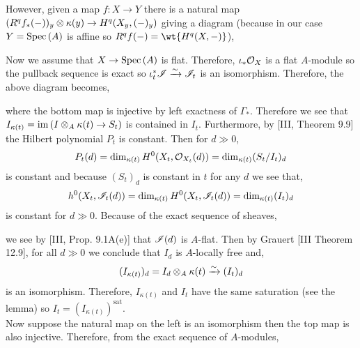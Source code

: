 \documentclass[12pt]{article}
\begin{document}
However, given a map $f : X \to Y$ there is a natural map $(R^q f_* (-))_y \otimes \kappa(y) \to H^q(X_y, (-)_y)$ giving a diagram (because in our case $Y = \mathrm{Spec}\left( A \right)$ is affine so $R^q f(-) = \wt{H^q(X, -)}$),
\begin{center}
\end{center}
Now we assume that $X \to \mathrm{Spec}\left( A \right)$ is flat. Therefore, $\iota_* \mathcal{O}_{X}$ is a flat $A$-module so the pullback sequence is exact so $\iota_t^* \mathscr{I} \xrightarrow{\sim} \mathscr{I}_t$ is an isomorphism. Therefore, the above diagram becomes,
\begin{center}
\end{center}
where the bottom map is injective by left exactness of $\Gamma_*$. Therefore we see that $I_{\kappa(t)} = \operatorname{\mathrm{im}}{(I \otimes_A \kappa(t) \to S_t)}$ is contained in $I_t$. Furthermore, by [III, Theorem 9.9] the Hilbert polynomial $P_t$ is constant. Then for $d \gg 0$,
\[ P_t(d) = \dim_{\kappa(t)} H^0(X_t, \mathcal{O}_{X_t}(d)) = \dim_{\kappa(t)} (S_t / I_t)_d \]
is constant and because $(S_t)_d$ is constant in $t$ for any $d$ we see that,
\[ h^0(X_t, \mathscr{I}_t(d)) = \dim_{\kappa(t)} H^0(X_t, \mathscr{I}_t(d)) = \dim_{\kappa(t)} (I_t)_d \]
is constant for $d \gg 0$. Because of the exact sequence of sheaves,
\begin{center}
\end{center}
we see by [III, Prop. 9.1A(e)] that $\mathscr{I}(d)$ is $A$-flat. Then by Grauert [III Theorem 12.9], for all $d \gg 0$ we conclude that $I_d$ is $A$-locally free and,
\[ (I_{\kappa(t)})_d = I_d \otimes_A \kappa(t) \xrightarrow{\sim} (I_t)_d \]
is an isomorphism. Therefore, $I_{\kappa(t)}$ and $I_t$ have the same saturation (see the lemma) so $I_t = (I_{\kappa(t)})^{\text{sat}}$.
\bigskip\\
Now suppose the natural map on the left is an isomorphism then the top map is also injective. Therefore, from the exact sequence of $A$-modules,
\end{document}
